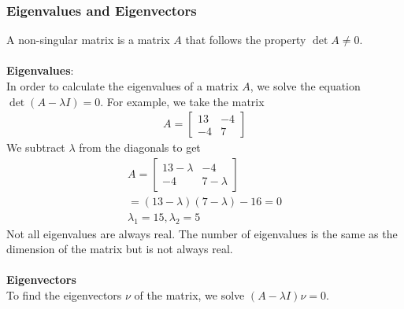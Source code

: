 \subsubsection{Eigenvalues and Eigenvectors}
A non-singular matrix is a matrix $A$ that follows the property $\det A \neq 0 $.
\\ \\
\textbf{Eigenvalues}: 
\\ 
In order to calculate the eigenvalues of a matrix $A$, we solve the equation $\det (A - \lambda I) = 0$. For example, we take the matrix
\begin{align}
  A = 
  \begin{bmatrix}
     13 & -4 \\
     -4 & 7
  \end{bmatrix}
\end{align}
We subtract $\lambda$ from the diagonals to get 
\begin{align}
  A = 
  \begin{bmatrix}
     13 - \lambda & -4 \\
     -4 & 7 - \lambda
  \end{bmatrix}
  \\
  = (13-  \lambda)(7 - \lambda) - 16 = 0 \\
  \lambda_1 = 15, \lambda_2 = 5
\end{align}
Not all eigenvalues are always real. 
The number of eigenvalues is the same as the dimension of the matrix but is not always real.
\\ \\
\textbf{Eigenvectors}
\\
To find the eigenvectors $\nu$ of the matrix, we solve $(A - \lambda I )\nu = 0$.
